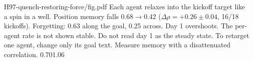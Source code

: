 {H97-quench-restoring-force/fig.pdf}
{Each agent relaxes into the kickoff target like a spin in a well.}
{Position memory falls 0.68$\to$0.42 ($\Delta\rho=+0.26\pm0.04$, 16/18 kickoffs). Forgetting: 0.63 along the goal, 0.25 across. Day 1 overshoots. The per-agent rate is not shown stable.}
{Do not read day 1 as the steady state. To retarget one agent, change only its goal text. Measure memory with a disattenuated correlation.}
{0.70}{1.06}
